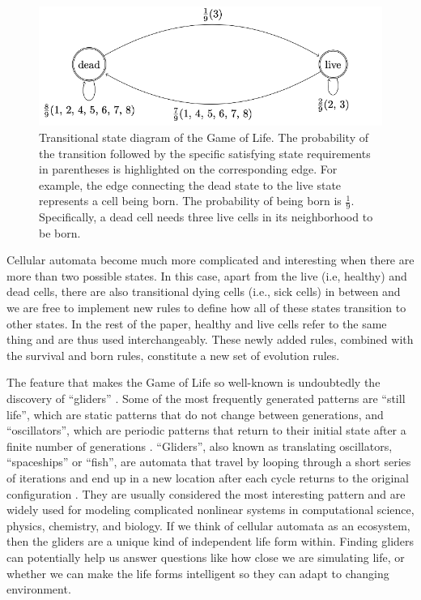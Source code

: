 \documentclass[12pt]{article}
\numberwithin{figure}{section} %
\begin{document}
\begin{figure}[H]
	\centering
	\includegraphics[width=\linewidth]{Section1/3}
	\caption[Transitional state diagram of the Game of Life]{Transitional state diagram of the Game of Life. The probability of the transition followed by the specific satisfying state requirements in parentheses is highlighted on the corresponding edge. For example, the edge connecting the dead state to the live state represents a cell being born. The probability of being born is $\frac{1}{9}$. Specifically, a dead cell needs three live cells in its neighborhood to be born.}
	\label{fig:Transitional state diagram of the Game of Life}
\end{figure}

Cellular automata become much more complicated and interesting when there are more than two possible states. In this case, apart from the live (i.e, healthy) and dead cells, there are also transitional dying cells (i.e., sick cells) in between and we are free to implement new rules to define how all of these states transition to other states. In the rest of the paper, healthy and live cells refer to the same thing and are thus used interchangeably. These newly added rules, combined with the survival and born rules, constitute a new set of evolution rules. 

The feature that makes the Game of Life so well-known is undoubtedly the discovery of “gliders” \cite{Glider}. Some of the most frequently generated patterns are “still life”, which are static patterns that do not change between generations, and “oscillators”, which are periodic patterns that return to their initial state after a finite number of generations \cite{Cellular automaton}. “Gliders”, also known as translating oscillators, “spaceships” or “fish”, are automata that travel by looping through a short series of iterations and end up in a new location after each cycle returns to the original configuration \cite{rake}. They are usually considered the most interesting pattern and are widely used for modeling complicated nonlinear systems in computational science, physics, chemistry, and biology. If we think of cellular automata as an ecosystem, then the gliders are a unique kind of independent life form within. Finding gliders can potentially help us answer questions like how close we are simulating life, or whether we can make the life forms intelligent so they can adapt to changing environment. 
\end{document}
